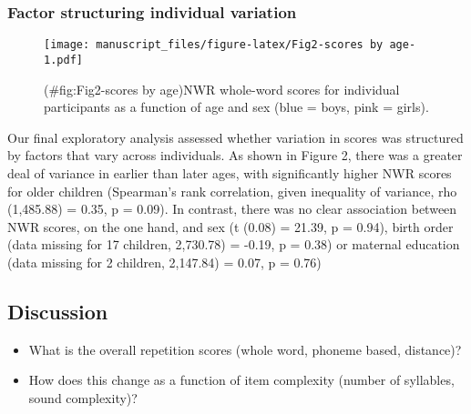 \documentclass[english,,man,floatsintext]{apa6}
\begin{document}
\hypertarget{factor-structuring-individual-variation}{%
\subsubsection{Factor structuring individual variation}\label{factor-structuring-individual-variation}}

\begin{figure}
\centering
\texttt{[image: manuscript\_files/figure-latex/Fig2-scores by age-1.pdf]}
\caption{(\#fig:Fig2-scores by age)NWR whole-word scores for individual participants as a function of age and sex (blue = boys, pink = girls).}
\end{figure}

Our final exploratory analysis assessed whether variation in scores was structured by factors that vary across individuals. As shown in Figure 2, there was a greater deal of variance in earlier than later ages, with significantly higher NWR scores for older children (Spearman's rank correlation, given inequality of variance, rho (1,485.88) = 0.35, p = 0.09). In contrast, there was no clear association between NWR scores, on the one hand, and sex (t (0.08) = 21.39, p = 0.94), birth order (data missing for 17 children, 2,730.78) = -0.19, p = 0.38) or maternal education (data missing for 2 children, 2,147.84) = 0.07, p = 0.76)

\hypertarget{discussion}{%
\subsection{Discussion}\label{discussion}}

\begin{itemize}
\item
  What is the overall repetition scores (whole word, phoneme based, distance)?
\item
  How does this change as a function of item complexity (number of syllables, sound complexity)?
\end{itemize}
\end{document}
